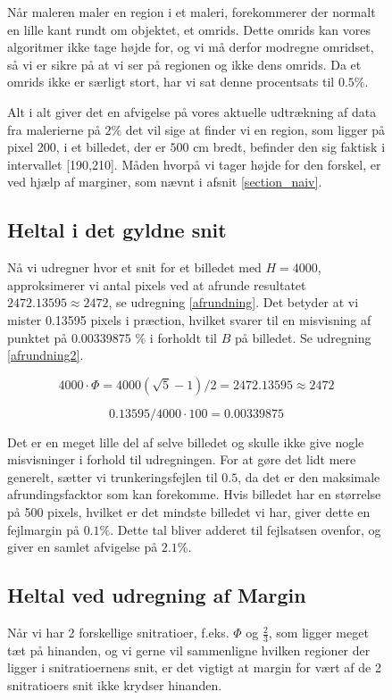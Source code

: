 \begin{figure}[h]
Når maleren maler en region i et maleri, forekommerer der normalt en
lille kant rundt om objektet, et omrids. Dette omrids kan vores
algoritmer ikke tage højde for, og vi må derfor modregne omridset, så vi
er sikre på at vi ser på regionen og ikke dens omrids. Da et omrids ikke
er særligt stort, har vi sat denne procentsats til $0.5\%$. 

Alt i alt giver det en afvigelse på vores aktuelle udtrækning af data
fra malerierne på $2\%$ det vil sige at finder vi en region, som ligger
på pixel 200, i et billedet, der er $500$ cm bredt, befinder den sig
faktisk i intervallet [190,210]. Måden hvorpå vi tager højde for den
forskel, er ved hjælp af marginer, som nævnt i afsnit
\ref{section_naiv}.


\subsection{Heltal i det gyldne snit}
Nå vi udregner hvor et snit for et billedet med $H = 4000$,
approksimerer vi antal pixels ved at afrunde resultatet $2472.13595
\approx 2472$, se udregning \ref{afrundning}. Det betyder at vi mister
0.13595 pixels i præction, hvilket svarer til en misvisning af punktet
på 0.00339875 $\%$ i forholdt til $B$ på billedet. Se udregning
\ref{afrundning2}.

\begin{equation}
	4000 \cdot \varPhi = 4000(\sqrt{5}-1)/2 = 2472.13595 \approx 2472 \label{afrundning}
\end{equation}

\begin{equation}
	0.13595/4000 \cdot 100 = 0.00339875 \label{afrundning2}
\end{equation}

Det er en meget lille del af selve billedet og skulle ikke give nogle
misvisninger i forhold til udregningen. For at gøre det lidt mere
generelt, sætter vi trunkeringsfejlen til $0.5$, da det er den maksimale
afrundingsfacktor som kan forekomme. Hvis billedet har en størrelse på
500 pixels, hvilket er det mindste billedet vi har, giver dette en fejlmargin
på $0.1 \%$. Dette tal bliver adderet til fejlsatsen ovenfor, og giver
en samlet afvigelse på $2.1\%$.



\subsection{Heltal ved udregning af Margin}
Når vi har 2 forskellige snitratioer, f.eks. $\varPhi$ og $\frac{2}{3}$,
som ligger meget tæt på hinanden, og vi gerne vil sammenligne hvilken
regioner der ligger i snitratioernens snit, er det vigtigt at margin for
vært af de 2 snitratioers snit ikke krydser hinanden. 


\end{figure}
